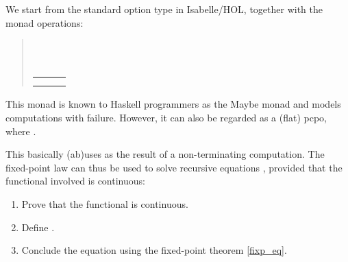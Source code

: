 \documentclass[copyright,creativecommons,sharealike]{eptcs}
\makeatletter
\theoremstyle{remark}
\newenvironment{eqns}{\begin{tabular}[t]{@{}l@{}c@{}l}}{\end{tabular}}
\makeatother
\begin{document}
\begin{isabellebody}
\begin{isamarkuptext}
  We start from the standard option type in Isabelle/HOL, together with
  the monad operations:
  \begin{quote}
  \\[1ex]
  \\[1ex]
  \begin{eqns}
  \isa{None\ {\isasymguillemotright}{\isacharequal}\ f} & \isa{\ {\isacharequal}\ } & \isa{None}\\
  \isa{Some\ y\ {\isasymguillemotright}{\isacharequal}\ f} & \isa{\ {\isacharequal}\ } & \isa{f\ y}
  \end{eqns}
  \end{quote}
  This monad is known to Haskell programmers as the Maybe monad and models
  computations with failure. However, it can also be
  regarded as a (flat) pcpo, where .

  This basically (ab)uses  as the result of a
  non-terminating computation. The fixed-point law can thus be used to solve 
  recursive equations , provided that the functional involved is continuous:
  \begin{enumerate}\parskip=0pt
  \item Prove that the functional  is continuous.
  \item Define .
  \item Conclude the equation  using the fixed-point theorem \eqref{fixp_eq}.
  \end{enumerate}


\end{isamarkuptext}
\end{isabellebody}
\end{document}
